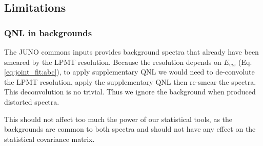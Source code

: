 \documentclass[../main.tex]{subfiles}
\begin{document}
%
%
%
%

\subsection{Limitations}
\label{sec:joint_fit:approach:lim}

\subsubsection{QNL in backgrounds}

The JUNO commons inputs provides background spectra that already have been smeared by the LPMT resolution. Because the resolution depends on $E_{vis}$ (Eq. \ref{eq:joint_fit:abc}), to apply supplementary QNL we would need to de-convolute the LPMT resolution, apply the supplementary QNL then re-smear the spectra. This deconvolution is no trivial. Thus we ignore the background when produced distorted spectra.

This should not affect too much the power of our statistical tools, as the backgrounds are common to both spectra and should not have any effect on the statistical covariance matrix.
\end{document}
